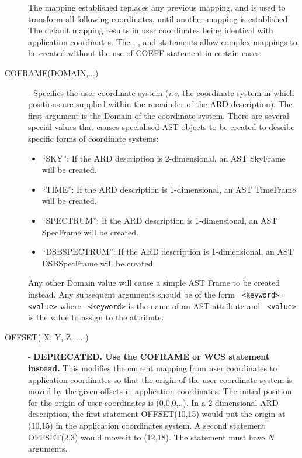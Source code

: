 \documentclass[11pt,nolof]{starlink}
\begin{document}
\begin{description}
The mapping established replaces any previous mapping, and is used to transform
all following coordinates, until another mapping is established. The default
mapping results in user coordinates being identical with application
coordinates. The , ,  and  statements allow complex
mappings to be created without the use of COEFF statement in certain cases.

\item [\label{ST:COFRAME}COFRAME(DOMAIN,...)] - Specifies the user
coordinate system (\emph{i.e.} the coordinate system in which positions
are supplied within the remainder of the ARD description). The first
argument is the Domain of the coordinate system. There are several
special values that causes specialised AST objects to be created to
descibe specific forms of coordinate systems:

\begin{itemize}
\item ``SKY'': If the ARD description is 2-dimensional, an AST SkyFrame will
be created.
\item ``TIME'': If the ARD description is 1-dimensional, an AST TimeFrame will
be created.
\item ``SPECTRUM'': If the ARD description is 1-dimensional, an AST SpecFrame
will be created.
\item ``DSBSPECTRUM'': If the ARD description is 1-dimensional, an AST DSBSpecFrame
will be created.
\end{itemize}

Any other Domain value will cause a simple AST Frame to be created
instead. Any subsequent arguments should be of the form \texttt{
<keyword>=<value>} where \texttt{ <keyword>} is the name of an AST attribute
and \texttt{ <value>} is the value to assign to the attribute.

\item [\label{ST:OFF}OFFSET( X, Y, Z, ... )] - \textbf{DEPRECATED. Use the COFRAME or WCS statement instead.} This modifies the current mapping
from user coordinates to application coordinates so that the origin of the
user coordinate system is moved by the given offsets in application
coordinates. The initial position for the origin of user coordinates is
(0,0,0,..). In a 2-dimensional ARD description, the first statement OFFSET(10,15)
would put the origin at (10,15) in the application coordinates system. A second
statement OFFSET(2,3) would move it to (12,18). The statement must have $N$
arguments.


\end{description}
\end{document}
